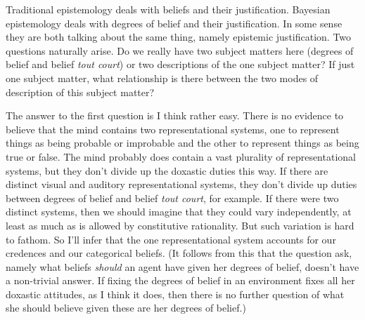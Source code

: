 


Traditional epistemology deals with beliefs and their justification. Bayesian epistemology deals with degrees of belief and their justification. In some sense they are both talking about the same thing, namely epistemic justification. Two questions naturally arise. Do we really have two subject matters here (degrees of belief and belief \textit{tout court}) or two descriptions of the one subject matter? If just one subject matter, what relationship is there between the two modes of description of this subject matter?

The answer to the first question is I think rather easy. There is no evidence to believe that the mind contains two representational systems, one to represent things as being probable or improbable and the other to represent things as being true or false. The mind probably does contain a vast plurality of representational systems, but they don't divide up the doxastic duties this way. If there are distinct visual and auditory representational systems, they don't divide up duties between degrees of belief and belief \textit{tout court}, for example. If there were two distinct systems, then we should imagine that they could vary independently, at least as much as is allowed by constitutive rationality. But such variation is hard to fathom. So I'll infer that the one representational system accounts for our credences and our categorical beliefs. (It follows from this that the question \cite{Bovens1999} ask, namely what beliefs \textit{should} an agent have given her degrees of belief, doesn't have a non-trivial answer. If fixing the degrees of belief in an environment fixes all her doxastic attitudes, as I think it does, then there is no further question of what she should believe given these are her degrees of belief.) 
